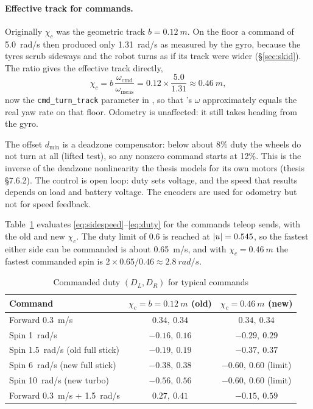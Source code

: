 \paragraph{Effective track for commands.} Originally $\chi_c$ was the
geometric track $b=\SI{0.12}{m}$. On the floor a command of
\SI{5.0}{rad/s} then produced only \SI{1.31}{rad/s} as measured by the gyro,
because the tyres scrub sideways and the robot turns as if its track were
wider (\S\ref{sec:skid}). The ratio gives the effective track directly,
\begin{equation}\label{eq:chicmd}
\chi_c = b\,\frac{\omega_{\mathrm{cmd}}}{\omega_{\mathrm{meas}}}
       = 0.12\times\frac{5.0}{1.31}\approx\SI{0.46}{m},
\end{equation}
now the \texttt{cmd\_turn\_track} parameter in , so that
's $\omega$ approximately equals the real yaw rate on that
floor. Odometry is unaffected: it still takes heading from the gyro.

The offset $d_{\min}$ is a deadzone
compensator: below about 8\% duty the wheels do not turn at all (lifted
test), so any nonzero command starts at 12\%. This is the inverse of the
deadzone nonlinearity the thesis models for its own motors (thesis
\S7.6.2). The control is open loop: duty sets voltage, and the speed that
results depends on load and battery voltage. The encoders are used for
odometry but not for speed feedback.

Table~\ref{tab:dutyex} evaluates \eqref{eq:sidespeed}--\eqref{eq:duty} for
the commands teleop sends, with the old and new $\chi_c$. The duty limit of
0.6 is reached at $\left\lvert u \right\rvert=0.545$, so the fastest either side can be
commanded is about \SI{0.65}{m/s}, and with $\chi_c=\SI{0.46}{m}$ the
fastest commanded spin is $2\times0.65/0.46\approx\SI{2.8}{rad/s}$.

\begin{table}[htbp]
\centering
\caption{Commanded duty $(D_L, D_R)$ for typical commands}
\label{tab:dutyex}
\small
\begin{tabular}{lcc}
\toprule
Command & $\chi_c=b=\SI{0.12}{m}$ (old) & $\chi_c=\SI{0.46}{m}$ (new) \\
\midrule
Forward \SI{0.3}{m/s} & $0.34,\ 0.34$ & $0.34,\ 0.34$ \\
Spin \SI{1}{rad/s} & $-0.16,\ 0.16$ & $-0.29,\ 0.29$ \\
Spin \SI{1.5}{rad/s} (old full stick) & $-0.19,\ 0.19$ & $-0.37,\ 0.37$ \\
Spin \SI{6}{rad/s} (new full stick) & $-0.38,\ 0.38$ & $-0.60,\ 0.60$ (limit) \\
Spin \SI{10}{rad/s} (new turbo) & $-0.56,\ 0.56$ & $-0.60,\ 0.60$ (limit) \\
Forward \SI{0.3}{m/s} + \SI{1.5}{rad/s} & $0.27,\ 0.41$ & $-0.15,\ 0.59$ \\
\bottomrule
\end{tabular}
\end{table}

